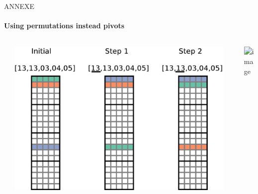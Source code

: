 \begin{frame}{ANNEXE}
\framesubtitle{Using permutations instead pivots}
\begin{columns}[c]
\begin{column}{0.02\textwidth}
\end{column}
\begin{column}{0.45\textwidth}
\includegraphics[width=\textwidth]{pivots_step}
\end{column}
\vline
\begin{column}{0.02\textwidth}
\end{column}
\begin{column}{0.45\textwidth}
\includegraphics<2>[width=\textwidth]{permutations_step}
\end{column}
\end{columns}
\end{frame}